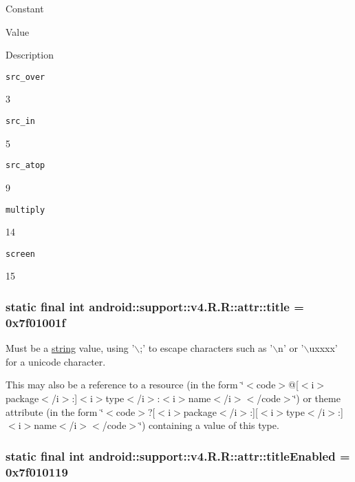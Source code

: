 Constant

Value

Description 

{\tt src\_\-over}

3

{\tt src\_\-in}

5

{\tt src\_\-atop}

9

{\tt multiply}

14

{\tt screen}

15\hypertarget{classandroid_1_1support_1_1v4_1_1_r_1_1attr_c61c98a2daf1e6804a68ffb1424a8f2f}{
\subsubsection[{title}]{\setlength{\rightskip}{0pt plus 5cm}static final int android::support::v4.R.R::attr::title = 0x7f01001f}}
\label{classandroid_1_1support_1_1v4_1_1_r_1_1attr_c61c98a2daf1e6804a68ffb1424a8f2f}


Must be a \hyperlink{classandroid_1_1support_1_1v4_1_1_r_1_1string}{string} value, using '$\backslash$;' to escape characters such as '$\backslash$n' or '$\backslash$uxxxx' for a unicode character. 

This may also be a reference to a resource (in the form \char`\"{}$<$code$>$@\mbox{[}$<$i$>$package$<$/i$>$:\mbox{]}$<$i$>$type$<$/i$>$:$<$i$>$name$<$/i$>$$<$/code$>$\char`\"{}) or theme attribute (in the form \char`\"{}$<$code$>$?\mbox{[}$<$i$>$package$<$/i$>$:\mbox{]}\mbox{[}$<$i$>$type$<$/i$>$:\mbox{]}$<$i$>$name$<$/i$>$$<$/code$>$\char`\"{}) containing a value of this type. \hypertarget{classandroid_1_1support_1_1v4_1_1_r_1_1attr_7551c66f76b8445295a8a5fb1a6f6b5f}{
\subsubsection[{titleEnabled}]{\setlength{\rightskip}{0pt plus 5cm}static final int android::support::v4.R.R::attr::titleEnabled = 0x7f010119}}
\label{classandroid_1_1support_1_1v4_1_1_r_1_1attr_7551c66f76b8445295a8a5fb1a6f6b5f}


